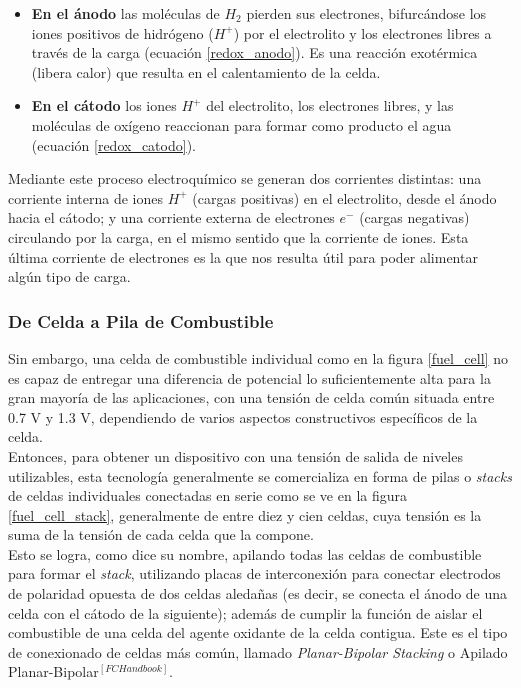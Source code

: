 \begin{itemize}
    \item \textbf{En el ánodo} las moléculas de $H_2$ pierden sus electrones, bifurcándose los iones positivos de hidrógeno ($H^{+}$) por el electrolito y los electrones libres a través de la carga (ecuación \ref{redox_anodo}). Es una reacción exotérmica (libera calor) que resulta en el calentamiento de la celda.
    \item \textbf{En el cátodo} los iones $H^{+}$ del electrolito, los electrones libres, y las moléculas de oxígeno reaccionan para formar como producto el agua (ecuación \ref{redox_catodo}).
\end{itemize}

Mediante este proceso electroquímico se generan dos corrientes distintas: una corriente interna de iones $H^{+}$ (cargas positivas) en el electrolito, desde el ánodo hacia el cátodo; y una corriente externa de electrones $e^-$ (cargas negativas) circulando por la carga, en el mismo sentido que la corriente de iones. Esta última corriente de electrones es la que nos resulta útil para poder alimentar algún tipo de carga.\\

\subsubsection{De Celda a Pila de Combustible}

Sin embargo, una celda de combustible individual como en la figura \ref{fuel_cell} no es capaz de entregar una diferencia de potencial lo suficientemente alta para la gran mayoría de las aplicaciones, con una tensión de celda común situada entre 0.7 V y 1.3 V, dependiendo de varios aspectos constructivos específicos de la celda.\\

Entonces, para obtener un dispositivo con una tensión de salida de niveles utilizables, esta tecnología generalmente se comercializa en forma de pilas o \textit{stacks} de celdas individuales conectadas en serie como se ve en la figura \ref{fuel_cell_stack}, generalmente de entre diez y cien celdas, cuya tensión es la suma de la tensión de cada celda que la compone.\\

Esto se logra, como dice su nombre, apilando todas las celdas de combustible para formar el \textit{stack}, utilizando placas de interconexión para conectar electrodos de polaridad opuesta de dos celdas aledañas (es decir, se conecta el ánodo de una celda con el cátodo de la siguiente); además de cumplir la función de aislar el combustible de una celda del agente oxidante de la celda contigua. Este es el tipo de conexionado de celdas más común, llamado \textit{Planar-Bipolar Stacking} o Apilado Planar-Bipolar$^{[FCHandbook]}$.

